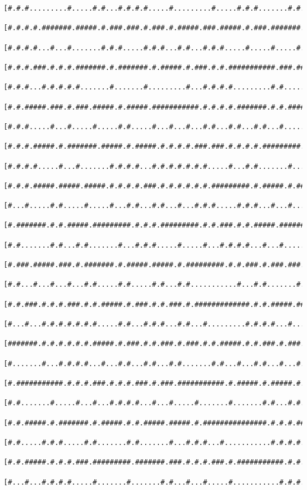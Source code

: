 \documentclass[a4paper,10pt,ngerman]{scrartcl}
\begin{document}
\begin{lstlisting}[frame=tb,basicstyle=\tiny\ttfamily]
 [#.#.#.........#.....#.#...#.#.#.#.....#.........#.....#.#.#.......#.#.#.#...#...#.......#.#.....#.#.#]
 [#.#.#.#.#######.#####.#.###.###.#.###.#.#####.###.#####.#.###.#######.#.###.#.#########.#.#.#####.#.#]
 [#.#.#.#...#...#.......#.#.#.....#.#.#...#.#...#.#.#.....#.....#.....#...#.#.#...#...#...#.#.#.....#.#]
 [#.#.#.###.#.#.#.#######.#.#######.#.#####.#.###.#.#.###########.###.#####.#.#.###.#.#.###.#.#.#####.#]
 [#.#.#...#.#.#.#.#.......#.......#.........#...#.#.#.#.........#.#.....#.....#.#...#.#.#...#.#.#.....#]
 [#.#.#####.###.#.###.#####.#.#####.###########.#.#.#.#.#######.#.#.#####.#######.###.#.#.#.#.#.#.#####]
 [#.#.#.....#...#.....#.....#.#.....#...#...#...#.#...#.#...#.#...#.....#.........#.#...#.#.#...#.#...#]
 [#.#.#.#####.#.#######.#####.#.#####.#.#.#.#.###.###.#.#.#.#.#########.###########.#####.#######.###.#]
 [#.#.#.#.....#...#.......#.#.#.#...#.#.#.#.#.#.#.....#...#.#.......#...#.........#...#...#.....#...#.#]
 [#.#.#.#####.#####.#####.#.#.#.#.###.#.#.#.#.#.#.#########.#.#####.#.###.#####.#.#.#.#.#.#.###.###.#.#]
 [#...#.....#.#.....#.....#...#.#...#.#...#...#.#.#.....#.#.#...#...#.....#...#.#...#...#.#...#...#.#.#]
 [#.#######.#.#.#####.#########.#.#.#.#########.#.#.###.#.#.#####.###########.#.#############.#.#.#.#.#]
 [#.#.......#.#...#.#.......#...#.#.#.....#.....#...#.#.#.#...#...#...........#.............#.#.#.#...#]
 [#.###.#####.###.#.#######.#.#####.#####.#.#########.#.#.###.#.###.###.###########.#####.#.#.#.#####.#]
 [#.#...#...#...#...#.#.....#.#.....#.#...#.#...........#...#.#.......#.......#...#...#...#.#.#.......#]
 [#.#.###.#.#.#.###.#.#.#####.#.###.#.#.###.#.#############.#.#.#####.#######.#.#.#.###.#.###.#########]
 [#...#...#.#.#.#.#.#.#.....#.#...#.#.#...#.#...#.........#.#.#.#...#...#.#...#.#.#.#...#.#...#.......#]
 [#######.#.#.#.#.#.#.#####.#.###.#.#.###.#.###.#.#.#####.#.#.###.#.###.#.#.###.#.###.###.#.###.#.#####]
 [#.......#...#.#.#.#...#...#.#...#.#...#.#.......#.#...#...#.#...#...#.#.#...#.#.....#...#.#...#.....#]
 [#.###########.#.#.#.###.#.#.#.###.#.###.###########.#.#####.#.#####.#.#.###.#.###########.#########.#]
 [#.#.......#.....#...#...#.#.#.#...#...#.....#.......#.......#.#...#.#.....#.#.....#.......#...#...#.#]
 [#.#.#####.#.#######.#.#####.#.#.#####.#####.#.###############.#.#.#.#######.#####.#.#######.#.#.#.#.#]
 [#.#.....#.#.#.....#.#.......#.#.......#...#.#.#...#...........#.#.#.#.........#...#.#...#...#.#.#...#]
 [#.#.#####.#.#.#.###.#########.#######.###.#.#.#.###.#.###########.#.#.#####.###.#.#.#.#.###.#.#.#####]
 [#...#...#.#.#.#.....#.......#.......#.#...#...#.....#...........#.#.#.....#.#...#.#...#.....#.#.....#]

\end{lstlisting}
\end{document}
